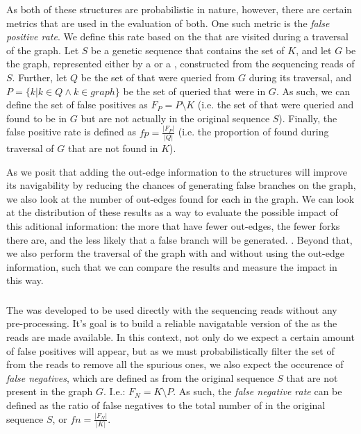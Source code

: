 As both of these structures are probabilistic in nature, however, there are certain metrics that are used in the evaluation of both.
One such metric is the \emph{false positive rate}. We define this rate based on the \kmers that are visited during a 
traversal of the graph. Let $S$ be a genetic sequence that contains the set of \kmers $K$, and let $G$ be the graph, represented
either by a \dBCM or a \dBHT, constructed from the sequencing reads of $S$. Further, let $Q$ be the set of \kmers that were queried
from $G$ during its traversal, and $P=\{k | k \in Q \wedge k \in graph\}$ be the set of queried \kmers that were in $G$. As such, we can
define the set of false positives as $F_P=P \setminus K$ (i.e. the set of \kmers that were queried and found to be in $G$ but are not
actually in the original sequence $S$). Finally, the false positive rate is defined as $\mathit{fp}=\frac{|F_P|}{|Q|}$ (i.e. the
proportion of \kmers found during traversal of $G$ that are not found in $K$).


As we posit that adding the out-edge information to the structures will improve its navigability by reducing the chances of generating
false branches on the graph, we also look at the number of out-edges found for each \kmer in the graph. We can look at the distribution
of these results as a way to evaluate the possible impact of this aditional information: the more \kmers that have fewer out-edges,
the fewer forks there are, and the less likely that a false branch will be generated. . Beyond that, we also perform the traversal of the graph with and
without using the out-edge information, such that we can compare the results and measure the impact in this way.

\subsubsection{\dBCM}

The \dBCM was developed to be used directly with the sequencing reads without any pre-processing. It's goal is to build a reliable
navigatable version of the \dBG as the reads are made available. In this context, not only do we expect a certain amount of false
positives will appear, but as we must probabilistically filter the set of \kmers from the reads to remove all the spurious ones, we
also expect the occurence of \emph{false negatives}, which are defined as \kmers from the original sequence $S$ that are not present
in the graph $G$. I.e.: $F_N=K \setminus P$. As such, the \emph{false negative rate} can be defined as the ratio of false negatives
to the total number of \kmers in the original sequence $S$, or $\mathit{fn}=\frac{|F_N|}{|K|}$.


